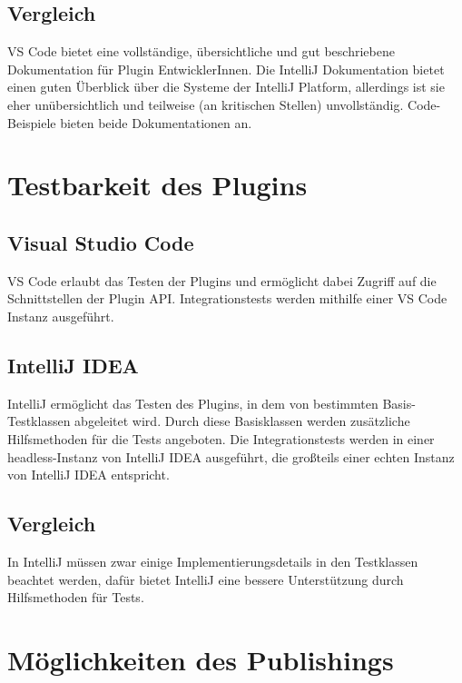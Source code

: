 \subsection{Vergleich}

VS Code bietet eine vollständige, übersichtliche und gut beschriebene 
Dokumentation für Plugin EntwicklerInnen. Die IntelliJ Dokumentation
bietet einen guten Überblick über die Systeme der IntelliJ Platform,
allerdings ist sie eher unübersichtlich und teilweise 
(an kritischen Stellen) unvollständig.
Code-Beispiele bieten beide Dokumentationen an.

\section{Testbarkeit des Plugins}
\label{sec:Vergleich_Testbarkeit}

\subsection{Visual Studio Code}

VS Code erlaubt das Testen der Plugins und ermöglicht
dabei Zugriff auf die Schnittstellen der Plugin API.
Integrationstests werden mithilfe einer VS Code Instanz ausgeführt.

\subsection{IntelliJ IDEA}

IntelliJ ermöglicht das Testen des Plugins, in dem
von bestimmten Basis-Testklassen abgeleitet wird. Durch diese
Basisklassen werden zusätzliche Hilfsmethoden für die Tests
angeboten. Die Integrationstests werden in einer
headless-Instanz von IntelliJ IDEA ausgeführt, die großteils
einer echten Instanz von IntelliJ IDEA entspricht.

\subsection{Vergleich}

In IntelliJ müssen zwar einige Implementierungsdetails in den Testklassen
beachtet werden, dafür bietet IntelliJ eine bessere Unterstützung
durch Hilfsmethoden für Tests.


\section{Möglichkeiten des Publishings}
\label{sec:Vergleich_Publishing}


